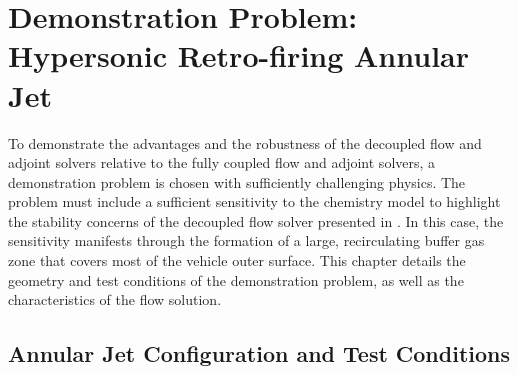 \chapter{Demonstration Problem: Hypersonic Retro-firing Annular Jet}
\label{chapter-five}

To demonstrate the advantages and the robustness of the decoupled flow and
adjoint solvers relative to the fully coupled flow and adjoint solvers, a
demonstration problem is chosen with sufficiently challenging physics.  The
problem must include a sufficient sensitivity to the chemistry model to
highlight the stability concerns of the decoupled flow solver presented in
.  In this case, the sensitivity manifests through
the formation of a large, recirculating buffer gas zone that covers most of the
vehicle outer surface. This chapter details the geometry and test conditions of
the demonstration problem, as well as the characteristics of the flow solution.

\section{Annular Jet Configuration and Test Conditions}

